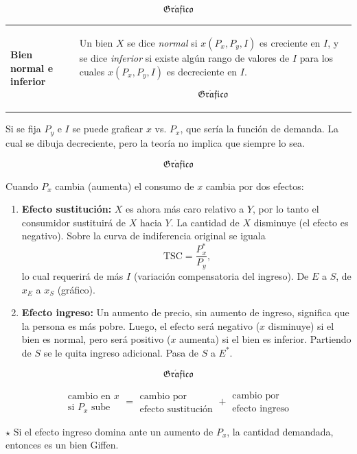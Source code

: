 \documentclass{report}
\newcommand{\GRAF}{\begin{center}$$\mathfrak{Gr\acute{a}fico}$$\end{center}}
\newenvironment{obs}{$\star$ }{}
\newenvironment{definition}[1]{\begin{center}
\begin{tabular}{p{3.5cm} p{12.5cm}}
\textbf{#1} &
}
{\\ \end{tabular}\end{center}}
\begin{document}
\GRAF

\begin{definition}{Bien normal e inferior}
Un bien $X$ se dice \textit{normal} si $x\!\left(P_x,P_y,I\right)$ es creciente en $I$, y se dice \textit{inferior} si existe algún rango de valores de $I$ para los cuales $x\!\left(P_x,P_y,I\right)$ es decreciente en $I$.

\GRAF
\end{definition}

Si se fija $P_y$ e $I$ se puede graficar $x$ vs. $P_x$, que sería la función de demanda. La cual se dibuja decreciente, pero la teoría no implica que siempre lo sea.

\GRAF

Cuando $P_x$ cambia (aumenta) el consumo de $x$ cambia por dos efectos:

\begin{enumerate}
\item \textbf{Efecto sustitución:} $X$ es ahora más caro relativo a $Y$, por lo tanto el consumidor sustituirá de $X$ hacia $Y$. La cantidad de $X$ disminuye (el efecto es negativo). Sobre la curva de indiferencia original se iguala
$$\mathrm{TSC}=\frac{P_x^*}{P_y}\text{,}$$
lo cual requerirá de más $I$ (variación compensatoria del ingreso). De $E$ a $S$, de $x_E$ a $x_S$ (gráfico).
\item \textbf{Efecto ingreso:} Un aumento de precio, sin aumento de ingreso, significa que la persona es más pobre. Luego, el efecto será negativo ($x$ disminuye) si el bien es normal, pero será positivo ($x$ aumenta) si el bien es inferior. Partiendo de $S$ se le quita ingreso adicional. Pasa de $S$ a $E^*$.
\end{enumerate}

\GRAF

$$\begin{matrix}
\text{cambio en }x\\
\text{si }P_x\text{ sube}
\end{matrix}=
\begin{matrix}
\text{cambio por }\\
\text{efecto sustitución}
\end{matrix}+
\begin{matrix}
\text{cambio por }\\
\text{efecto ingreso}
\end{matrix}$$

\begin{obs}
Si el efecto ingreso domina ante un aumento de $P_x$, la cantidad demandada, entonces es un bien Giffen.
\end{obs}
\end{document}
